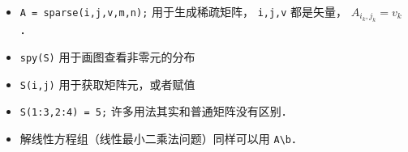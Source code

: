 
\begin{issues}
\issueDraft
\end{issues}

\begin{itemize}
\item \verb|A = sparse(i,j,v,m,n);| 用于生成稀疏矩阵， \verb|i,j,v| 都是矢量， $A_{i_k,j_k} = v_k$．
\item \verb|spy(S)| 用于画图查看非零元的分布
\item \verb|S(i,j)| 用于获取矩阵元，或者赋值
\item \verb|S(1:3,2:4) = 5;| 许多用法其实和普通矩阵没有区别．
\item 解线性方程组（线性最小二乘法问题）同样可以用 \verb|A\b|．
\end{itemize}
